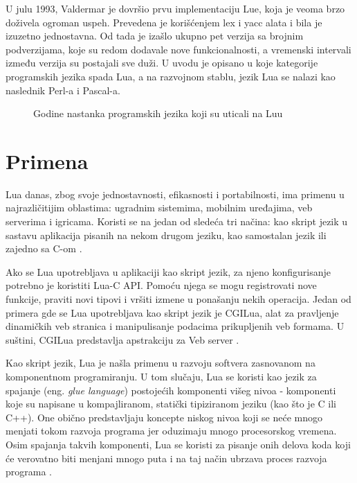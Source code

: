 \documentclass[a4paper]{article}
\begin{document}
U julu 1993, Valdermar je dovršio prvu implementaciju Lue, koja je veoma brzo doživela ogroman uspeh. Prevedena je korišćenjem lex i yacc alata i bila je izuzetno jednostavna. Od tada je izašlo ukupno pet verzija sa brojnim podverzijama, koje su redom dodavale nove funkcionalnosti, a vremenski intervali između verzija su postajali sve duži. U uvodu je opisano u koje kategorije programskih jezika spada Lua, a na razvojnom stablu, jezik Lua se nalazi kao naslednik Perl-a i Pascal-a.
 

\begin{figure}
\caption{Godine nastanka programskih jezika koji su uticali na Luu}
\label{fig:godine}
\end{figure}

\section{Primena}	
\label{sec:primena}


Lua danas, zbog svoje jednostavnosti, efikasnosti i portabilnosti, ima primenu u najrazličitijim oblastima: ugradnim sistemima, mobilnim  uređajima, veb serverima i igricama. Koristi se na jedan od sledeća tri načina: kao skript jezik u sastavu aplikacija pisanih na nekom drugom jeziku, kao samostalan jezik ili zajedno sa C-om \cite{bookProgInLua}.

Ako se Lua upotrebljava u aplikaciji kao skript jezik, za njeno konfigurisanje potrebno je koristiti Lua-C API. Pomoću njega se mogu registrovati nove funkcije, praviti novi tipovi i vršiti izmene u ponašanju nekih operacija. Jedan od primera gde se Lua upotrebljava kao skript jezik je CGILua, alat za pravljenje dinamičkih veb stranica i manipulisanje podacima prikupljenih veb formama. U suštini, CGILua predstavlja apstrakciju za Veb server \cite{keplerProject}.

Kao skript jezik, Lua je našla primenu u razvoju softvera zasnovanom na komponentnom programiranju. U tom slučaju, Lua se koristi kao jezik za spajanje (eng. \textit{glue language}) postojećih komponenti višeg nivoa - komponenti koje su napisane u kompajliranom, statički tipiziranom jeziku (kao što je C ili C++). One obično predstavljaju koncepte niskog nivoa koji se neće mnogo menjati tokom razvoja programa jer oduzimaju mnogo procesorskog vremena. Osim spajanja takvih komponenti, Lua se koristi za pisanje onih delova koda koji će verovatno biti menjani mnogo puta i na taj način ubrzava proces razvoja programa \cite{bookProgInLua}.
\end{document}
